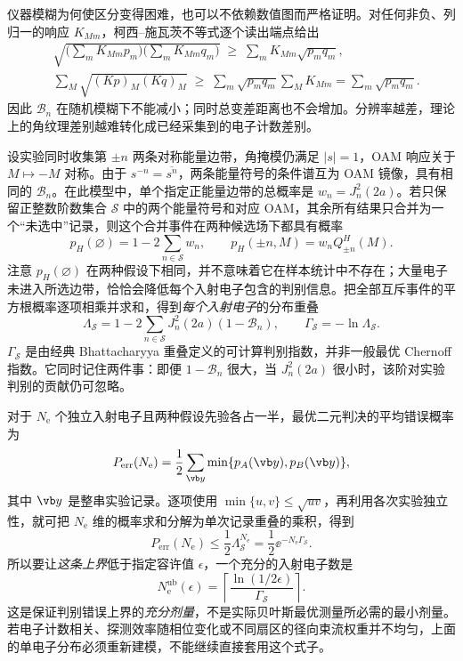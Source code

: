 仪器模糊为何使区分变得困难，也可以不依赖数值图而严格证明。对任何非负、列归一的响应 $K_{Mm}$，柯西--施瓦茨不等式逐个读出端点给出
\begin{align*}
 &\sqrt{\Big(\sum_mK_{Mm}p_m\Big)\Big(\sum_mK_{Mm}q_m\Big)}
 \;\geq\;\sum_m K_{Mm}\sqrt{p_m q_m},\\
 &\sum_M\sqrt{(Kp)_M(Kq)_M}\;\geq\;
 \sum_m\sqrt{p_mq_m}\sum_MK_{Mm}
 =\sum_m\sqrt{p_mq_m}.
\end{align*}
因此 $\mathcal B_n$ 在随机模糊下不能减小；同时总变差距离也不会增加。分辨率越差，理论上的角纹理差别越难转化成已经采集到的电子计数差别。

设实验同时收集第 $\pm n$ 两条对称能量边带，角掩模仍满足 $|s|=1$，OAM 响应关于 $M\mapsto-M$ 对称。由于 $s^{-n}=\overline{s^n}$，两条能量符号的条件谱互为 OAM 镜像，具有相同的 $\mathcal B_n$。在此模型中，单个指定正能量边带的总概率是 $w_n=J_n^2(2a)$。若只保留正整数阶数集合 $\mathcal S$ 中的两个能量符号和对应 OAM，其余所有结果只合并为一个“未选中”记录，则这个合并事件在两种候选场下都具有概率
\[
 p_H(\varnothing)=1-2\sum_{n\in\mathcal S}w_n,
 \qquad p_H(\pm n,M)=w_nQ_{\pm n}^H(M).
\]
注意 $p_H(\varnothing)$ 在两种假设下相同，并不意味着它在样本统计中不存在；大量电子未进入所选边带，恰恰会降低每个入射电子包含的判别信息。把全部互斥事件的平方根概率逐项相乘并求和，得到\emph{每个入射电子}的分布重叠
\begin{equation}
 \Lambda_{\mathcal S}=
 1-2\sum_{n\in\mathcal S}J_n^2(2a)(1-\mathcal B_n),
 \qquad
 \Gamma_{\mathcal S}=-\ln\Lambda_{\mathcal S}.
 \label{eq:oam-information-exponent}
\end{equation}
$\Gamma_{\mathcal S}$ 是由经典 Bhattacharyya 重叠定义的可计算判别指数，并非一般最优 Chernoff 指数。它同时记住两件事：即便 $1-\mathcal B_n$ 很大，当 $J_n^2(2a)$ 很小时，该阶对实验判别的贡献仍可忽略。

对于 $N_{\mathrm e}$ 个独立入射电子且两种假设先验各占一半，最优二元判决的平均错误概率为
\[
 P_{\mathrm{err}}(N_{\mathrm e})=
 \frac12\sum_{\vb y}\min\{p_A(\vb y),p_B(\vb y)\},
\]
其中 $\vb y$ 是整串实验记录。逐项使用 $\min\{u,v\}\leq\sqrt{uv}$，再利用各次实验独立性，就可把 $N_{\mathrm e}$ 维的概率求和分解为单次记录重叠的乘积，得到
\begin{equation}
 P_{\mathrm{err}}(N_{\mathrm e})
 \leq\frac12\Lambda_{\mathcal S}^{N_{\mathrm e}}
 =\frac12\ee^{-N_{\mathrm e}\Gamma_{\mathcal S}}.
 \label{eq:oam-error-bound}
\end{equation}
所以要让\emph{这条上界}低于指定容许值 $\epsilon$，一个充分的入射电子数是
\begin{equation}
 N_{\mathrm e}^{\mathrm{ub}}(\epsilon)
 =\left\lceil\frac{\ln(1/2\epsilon)}{\Gamma_{\mathcal S}}\right\rceil.
 \label{eq:oam-dose-sufficient}
\end{equation}
这是保证判别错误上界的\emph{充分剂量}，不是实际贝叶斯最优测量所必需的最小剂量。若电子计数相关、探测效率随相位变化或不同扇区的径向束流权重并不均匀，上面的单电子分布必须重新建模，不能继续直接套用这个式子。

